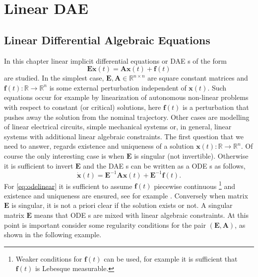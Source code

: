 %
%

\chapter{Linear DAE}
	\label{ch:linearDAE}
	\section{Linear Differential Algebraic Equations}
		In this chapter linear implicit differential equations or DAE s of the form
		\textbf{}
		\begin{equation}
			\label{eq:daelinear}
			\bm{E}\dot{\bm{x}}(t) = \bm{A}\bm{x}(t)+\bm{f}(t)
		\end{equation}
		are studied. In the simplest case, $\bm{E},\bm{A}\in\mathbb{R}^{n\times n}$ are square constant matrices and $\bm{f}(t):\mathbb{R}\rightarrow\mathbb{R}^{n}$ is some external perturbation independent of $\bm{x}(t)$. Such equations occur for example by linearization of autonomous non-linear problems with respect to constant (or critical) solutions, here $\bm{f}(t)$ is a perturbation that pushes away the solution from the nominal trajectory. Other cases are modelling of  linear electrical circuits, simple mechanical systems or, in general, linear systems with additional linear algebraic  constraints.
		The first question that we need to answer, regards existence and uniqueness of a solution $\bm{x}(t):\mathbb{R}\rightarrow\mathbb{R}^{n}$.
		Of course the only interesting case is when $\bm{E}$ is singular (not invertible). Otherwise it is sufficient to invert $\bm{E}$ and the DAE s can be written as a ODE s as follows,
		\begin{equation}
			\label{eq:odelinear}
			\dot{\bm{x}}(t) = \bm{E}^{-1}\bm{A}\bm{x}(t)+\bm{E}^{-1}\bm{f}(t).
		\end{equation}
		For \cref{eq:odelinear} it is sufficient to assume $\bm{f}(t)$ piecewise continuous \footnote{Weaker conditions for $\bm{f}(t)$ can be used, for example it is sufficient that $\bm{f}(t)$ is Lebesque measurable.} and existence and uniqueness are ensured, see for example \cite{coddington1955theory}.  
		Conversely when matrix $\bm{E}$ is singular, it is not a priori clear if the solution exists or not. A singular matrix $\bm{E}$ means that ODE s are mixed with linear algebraic constraints. At this point is important consider some regularity conditions for the pair $(\bm{E},\bm{A})$, as shown in the following example. 
